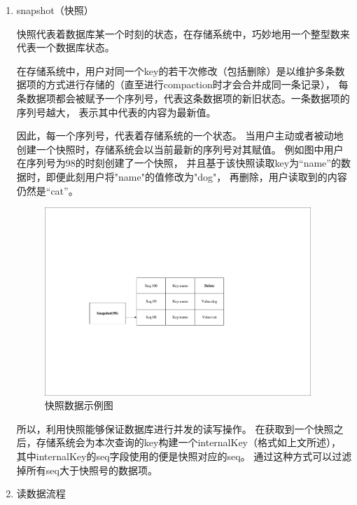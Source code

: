 		\begin{enumerate}
		\item snapshot（快照）
		
		快照代表着数据库某一个时刻的状态，在存储系统中，巧妙地用一个整型数来代表一个数据库状态。

		在存储系统中，用户对同一个key的若干次修改（包括删除）是以维护多条数据项的方式进行存储的（直至进行compaction时才会合并成同一条记录），
		每条数据项都会被赋予一个序列号，代表这条数据项的新旧状态。一条数据项的序列号越大，
		表示其中代表的内容为最新值。

		因此，每一个序列号，代表着存储系统的一个状态。
		当用户主动或者被动地创建一个快照时，存储系统会以当前最新的序列号对其赋值。
		例如图中用户在序列号为98的时刻创建了一个快照，
		并且基于该快照读取key为“name”的数据时，即便此刻用户将"name"的值修改为"dog"，
		再删除，用户读取到的内容仍然是“cat”。

		\begin{figure}[H]
			\centering
			\includegraphics[width=0.95\textwidth]{pdf/snapshot.pdf}
			\caption{快照数据示例图}
			\label{snapshot}
		\end{figure}

		所以，利用快照能够保证数据库进行并发的读写操作。
		在获取到一个快照之后，存储系统会为本次查询的key构建一个internalKey（格式如上文所述），
		其中internalKey的seq字段使用的便是快照对应的seq。
		通过这种方式可以过滤掉所有seq大于快照号的数据项。
		

		\item 读数据流程
		

\end{enumerate}
